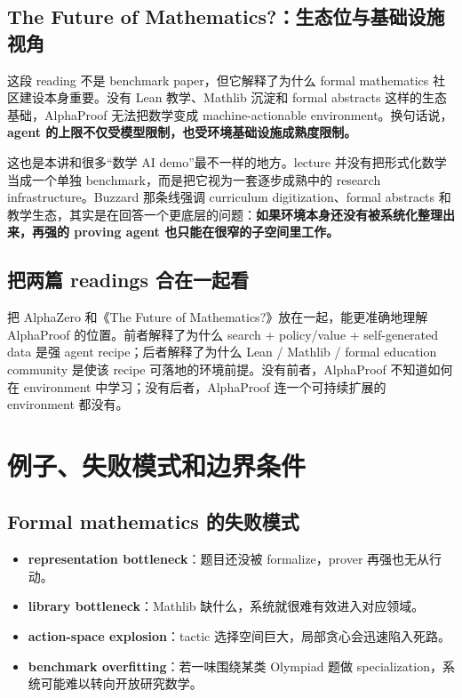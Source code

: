 \subsection{The Future of Mathematics?：生态位与基础设施视角}

这段 reading 不是 benchmark paper，但它解释了为什么 formal mathematics 社区建设本身重要。没有 Lean 教学、Mathlib 沉淀和 formal abstracts 这样的生态基础，AlphaProof 无法把数学变成 machine-actionable environment。换句话说，\textbf{agent 的上限不仅受模型限制，也受环境基础设施成熟度限制。}

这也是本讲和很多“数学 AI demo”最不一样的地方。lecture 并没有把形式化数学当成一个单独 benchmark，而是把它视为一套逐步成熟中的 research infrastructure。Buzzard 那条线强调 curriculum digitization、formal abstracts 和教学生态，其实是在回答一个更底层的问题：\textbf{如果环境本身还没有被系统化整理出来，再强的 proving agent 也只能在很窄的子空间里工作。}

\subsection{把两篇 readings 合在一起看}

把 AlphaZero 和《The Future of Mathematics?》放在一起，能更准确地理解 AlphaProof 的位置。前者解释了为什么 search + policy/value + self-generated data 是强 agent recipe；后者解释了为什么 Lean / Mathlib / formal education community 是使该 recipe 可落地的环境前提。没有前者，AlphaProof 不知道如何在 environment 中学习；没有后者，AlphaProof 连一个可持续扩展的 environment 都没有。

\section{例子、失败模式和边界条件}

\subsection{Formal mathematics 的失败模式}

\begin{itemize}
\item \textbf{representation bottleneck}：题目还没被 formalize，prover 再强也无从行动。
\item \textbf{library bottleneck}：Mathlib 缺什么，系统就很难有效进入对应领域。
\item \textbf{action-space explosion}：tactic 选择空间巨大，局部贪心会迅速陷入死路。
\item \textbf{benchmark overfitting}：若一味围绕某类 Olympiad 题做 specialization，系统可能难以转向开放研究数学。
\end{itemize}

